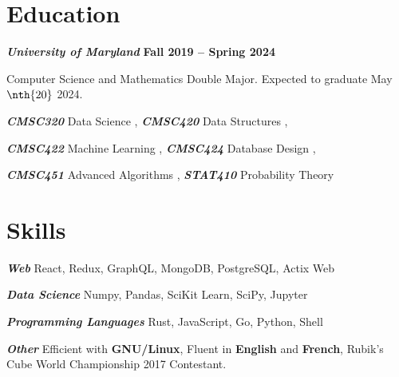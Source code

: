 \documentclass[12pt]{article}
\newcommand{\medtitle}[3]{
  \textbf{\textit{#1}} \hfill {#2}

  \smallskip

  {#3} %

  \medskip
}
\newcommand{\smalltitle}[2]{
   \textbf{\textit{#1}} #2

   \smallskip
}
\newcommand{\course}[2]{
  {\small {\textbf{\textit{#1}}} {#2}}
}
\begin{document}
    \section{Education}

    \medtitle{University of Maryland}
    {\textbf{Fall 2019 -- Spring 2024}}
    {
       Computer Science and Mathematics Double Major. Expected to graduate May
       $\nth{20}$ 2024.
    }

    \course{CMSC320}{Data Science}, \course{CMSC420}{Data Structures},
    \course{CMSC422}{Machine Learning}, \course{CMSC424}{Database Design},
    \course{CMSC451}{Advanced Algorithms}, \course{STAT410}{Probability Theory}

    \section{Skills}

    \smalltitle{Web}{
      React, Redux, GraphQL, MongoDB, PostgreSQL, Actix Web
    }

    \smalltitle{Data Science}{
      Numpy, Pandas, SciKit Learn, SciPy, Jupyter
    }

    \smalltitle{Programming Languages}{
      Rust, JavaScript, Go, Python, Shell
    }

    \smalltitle{Other}{
      Efficient with {\bf GNU/Linux}, Fluent in {\bf English} and {\bf French},
      Rubik's Cube World Championship 2017 Contestant.
    }
\end{document}
